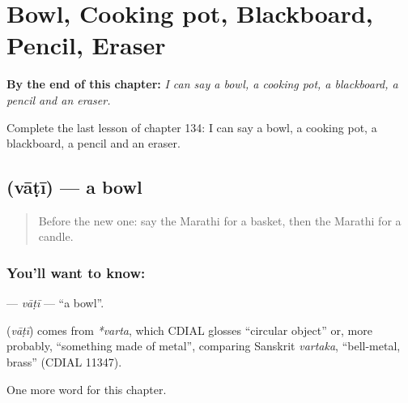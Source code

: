 
\chapter{Bowl, Cooking pot, Blackboard, Pencil, Eraser}
\label{ch:mr-bowl-cooking-pot-blackboard-pencil-eraser}

\begin{chapteropening}
\textbf{By the end of this chapter:} \emph{I can say a bowl, a cooking pot, a blackboard, a pencil and an eraser.}

Complete the last lesson of chapter 134: I can say a bowl, a cooking pot, a blackboard, a pencil and an eraser.
\end{chapteropening}

\section[\texorpdfstring{\mr{वाटी} (vāṭī)}{वाटी (vāṭī)}]{ (vāṭī) — a bowl}

\label{lesson:MR-C134-vati}



\begin{quote}
Before the new one: say the Marathi for a basket, then the Marathi for a candle.
\end{quote}

\subsection*{You'll want to know: }
\textbf{} — \emph{vāṭī} — \textquotedblleft{}a bowl\textquotedblright{}.

\begin{cousinweb}
\textbf{} (\emph{vāṭī}) comes from \emph{*varta}, which CDIAL glosses \textquotedblleft{}circular object\textquotedblright{} or, more probably, \textquotedblleft{}something made of metal\textquotedblright{}, comparing Sanskrit \emph{vartaka}, \textquotedblleft{}bell-metal, brass\textquotedblright{} (CDIAL 11347).
\end{cousinweb}

\begin{grammarlens}[title={What you've built}]
One more word for this chapter.
\end{grammarlens}

